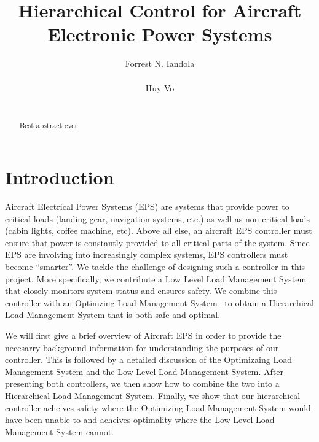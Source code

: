 \documentclass{acm_proc_article-sp}
\begin{document}
\title{Hierarchical Control for Aircraft Electronic Power Systems}

\author{
\alignauthor
Forrest N. Iandola\\
       \\
\alignauthor
Huy Vo\\
       \\
}

\maketitle
\begin{abstract}
Best abstract ever
\end{abstract}


\section{Introduction}
Aircraft Electrical Power Systems (EPS) are systems that provide power to critical loads (landing gear, navigation systems, etc.)
as well as non critical loads (cabin lights, coffee machine, etc). Above all else, an aircraft EPS controller must ensure that
power is constantly provided to all critical parts of the system. Since EPS are involving into increasingly complex systems, EPS
controllers must become ``smarter''. We tackle the challenge of designing such a controller in this project. More specifically,
we contribute a Low Level Load Management System that closely monitors system status and ensures safety. We combine this
controller with an Optimzing Load Management System~\cite{mehdi} to obtain a Hierarchical Load Management System that is
both safe and optimal.

We will first give a brief overview of Aircraft EPS in order to provide the necesarry background information for understanding
the purposes of our controller. This is followed by a detailed discussion of the Optimizaing Load Management System and the
Low Level Load Management System. After presenting both controllers, we then show how to combine the two into a Hierarchical
Load Management System. Finally, we show that our hierarchical controller acheives safety where the Optimizing Load Management
System would have been unable to and acheives optimality where the Low Level Load Management System cannot.
\end{document}

